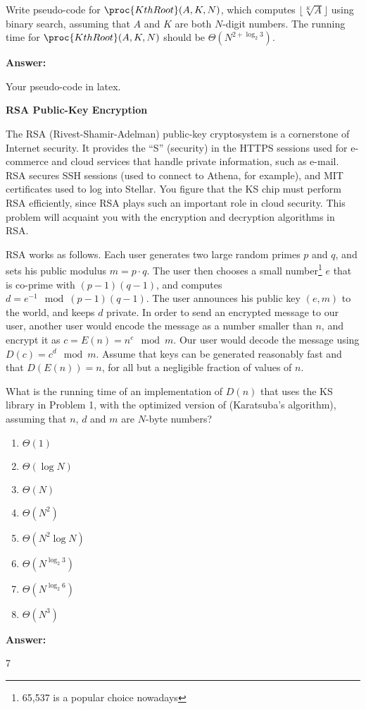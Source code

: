 \documentclass[12pt,twoside]{article}
\newcommand{\answer}{
 \par\medskip
 \textbf{Answer:}
}
\newcommand{\answerIp}{ \answer
Your pseudo-code in latex.
}
\newcommand{\answerIIa}{ \answer
7
}
\begin{document}
\begin{problems}
\begin{problemparts}
\problempart {} Write pseudo-code for $\proc{KthRoot}(A, K, N)$, which
computes $\lfloor \sqrt[K]{A} \rfloor$ using binary search, assuming that $A$
and $K$ are both $N$-digit numbers. The running time for $\proc{KthRoot}(A, K,
N)$ should be $\Theta(N^{2 + \log_2 3})$.

\answerIp

\end{problemparts}

\newpage

\problem {} \textbf{RSA Public-Key Encryption}

The RSA (Rivest-Shamir-Adelman) public-key cryptosystem is a cornerstone of
Internet security. It provides the ``S'' (security) in the HTTPS sessions used
for e-commerce and cloud services that handle private information, such as
e-mail. RSA secures SSH sessions (used to connect to Athena, for example), and
MIT certificates used to log into Stellar. You figure that the KS chip must
perform RSA efficiently, since RSA plays such an important role in cloud
security. This problem will acquaint you with the encryption and decryption
algorithms in RSA.

RSA works as follows. Each user generates two large random primes $p$ and $q$,
and sets his public modulus $m = p \cdot q$. The user then chooses a small
number\footnote{65,537 is a popular choice nowadays} $e$ that is co-prime with
$(p - 1)(q - 1)$, and computes $d = e^{-1} \mod (p - 1)(q - 1)$. The user
announces his public key $(e, m)$ to the world, and keeps $d$ private. In order
to send an encrypted message to our user, another user would encode the message
as a number smaller than $n$, and encrypt it as $c = E(n) = n^e \mod m$. Our
user would decode the message using $D(c) = c^d \mod m$. Assume that keys can be
generated reasonably fast and that $D(E(n)) = n$, for all but a negligible
fraction of values of $n$.

\begin{problemparts}
\problempart {} What is the running time of an implementation of $D(n)$
that uses the KS library in Problem 1, with the optimized version of
 (Karatsuba's algorithm), assuming that $n$, $d$ and $m$ are
$N$-byte numbers?
\begin{enumerate}
  \item $\Theta(1)$
  \item $\Theta(\log N)$
  \item $\Theta(N)$
  \item $\Theta(N^2)$
  \item $\Theta(N^2 \log N)$
  \item $\Theta(N^{\log_2 3})$
  \item $\Theta(N^{\log_2 6})$
  \item $\Theta(N^3)$
\end{enumerate}
\answerIIa


\end{problemparts}
\end{problems}
\end{document}
